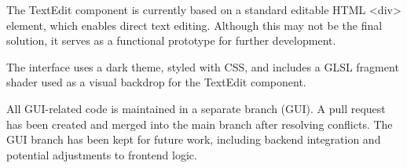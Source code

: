 \documentclass[12pt]{article}
\begin{document}
The TextEdit component is currently based on a standard editable HTML <div> element, which enables direct text editing. Although this may not be the final solution, it serves as a functional prototype for further development.

The interface uses a dark theme, styled with CSS, and includes a GLSL fragment shader used as a visual backdrop for the TextEdit component.

All GUI-related code is maintained in a separate branch (GUI). A pull request has been created and merged into the main branch after resolving conflicts. The GUI branch has been kept for future work, including backend integration and potential adjustments to frontend logic.
\end{document}
